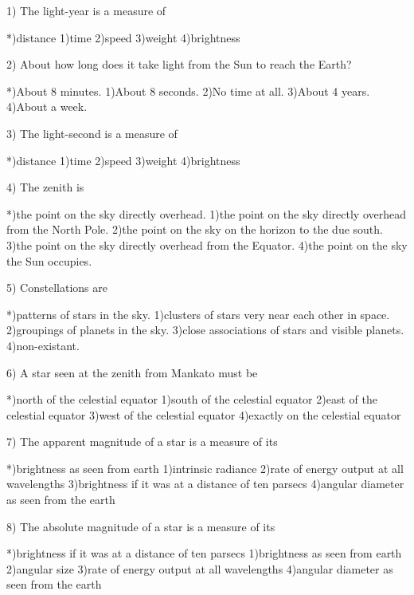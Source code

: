 % 
% 

  1) The light-year is a measure of
 
 *)distance
 1)time                                       
 2)speed
 3)weight                         
 4)brightness           
 
 2) About how long does it take light from the Sun to reach the Earth?
 
 *)About 8 minutes.
 1)About 8 seconds.
 2)No time at all.
 3)About 4 years.
 4)About a week.
 
 3) The light-second is a measure of
 
 *)distance
 1)time                                       
 2)speed
 3)weight                         
 4)brightness           
 
 4) The zenith is
 
 *)the point on the sky directly overhead.
 1)the point on the sky directly overhead from the North Pole.
 2)the point on the sky on the horizon to the due south.
 3)the point on the sky directly overhead from the Equator.
 4)the point on the sky the Sun occupies.
 
 5) Constellations are 
 
 *)patterns of stars in the sky.
 1)clusters of stars very near each other in space.
 2)groupings of planets in the sky.
 3)close associations of stars and visible planets.
 4)non-existant.
 
 6) A star seen at the zenith from Mankato must be
 
 *)north of the celestial equator
 1)south of the celestial equator
 2)east of the celestial equator
 3)west of the celestial equator
 4)exactly on the celestial equator
 
 7) The apparent magnitude of a star is a measure of its
 
 *)brightness as seen from earth
 1)intrinsic radiance
 2)rate of energy output at all wavelengths
 3)brightness if it was at a distance of ten parsecs
 4)angular diameter as seen from the earth
 
 8) The absolute magnitude of a star is a measure of its
 
 *)brightness if it was at a distance of ten parsecs
 1)brightness as seen from earth
 2)angular size
 3)rate of energy output at all wavelengths
 4)angular diameter as seen from the earth
 
